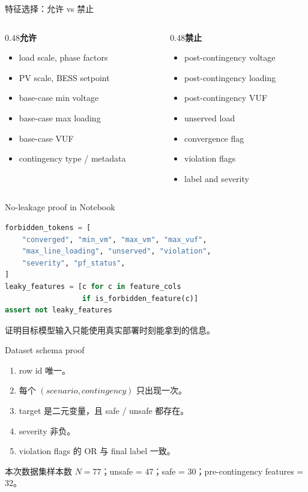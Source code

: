 \documentclass[aspectratio=169,11pt]{beamer}
\begin{document}
\begin{frame}{特征选择：允许 vs 禁止}
\begin{columns}
\begin{column}{0.48\textwidth}\textbf{允许}\begin{itemize}\item load scale, phase factors\item PV scale, BESS setpoint\item base-case min voltage\item base-case max loading\item base-case VUF\item contingency type / metadata\end{itemize}\end{column}
\begin{column}{0.48\textwidth}\textbf{禁止}\begin{itemize}\item post-contingency voltage\item post-contingency loading\item post-contingency VUF\item unserved load\item convergence flag\item violation flags\item label and severity\end{itemize}\end{column}
\end{columns}
\end{frame}

\begin{frame}[fragile]{No-leakage proof in Notebook}
\begin{lstlisting}[language=Python]
forbidden_tokens = [
    "converged", "min_vm", "max_vm", "max_vuf",
    "max_line_loading", "unserved", "violation",
    "severity", "pf_status",
]
leaky_features = [c for c in feature_cols
                  if is_forbidden_feature(c)]
assert not leaky_features
\end{lstlisting}
\begin{block}{证明目标}模型输入只能使用真实部署时刻能拿到的信息。\end{block}
\end{frame}

\begin{frame}{Dataset schema proof}
\begin{enumerate}\item row id 唯一。\item 每个 $(scenario, contingency)$ 只出现一次。\item target 是二元变量，且 safe / unsafe 都存在。\item severity 非负。\item violation flags 的 OR 与 final label 一致。\end{enumerate}
\begin{block}{本次数据集}样本数 $N=77$；unsafe = 47；safe = 30；pre-contingency features = 32。\end{block}
\end{frame}
\end{document}
